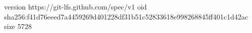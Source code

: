 version https://git-lfs.github.com/spec/v1
oid sha256:f41d76eeed7a4459269d401228df31b51c52833618e998268845ff401c1d42ac
size 5728
